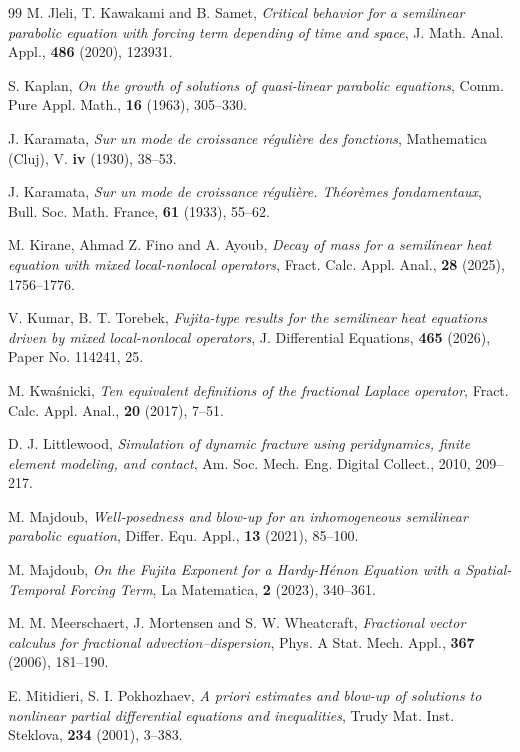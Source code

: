 \documentclass[12pt,reqno]{amsart}
\theoremstyle{plain}
\theoremstyle{definition}
\theoremstyle{remark}
\numberwithin{equation}{section}
\begin{document}
\begin{thebibliography}{99}
 {M. Jleli, T. Kawakami and B. Samet}, {\em Critical behavior for a semilinear parabolic equation with forcing term depending of time and space}, J. Math. Anal. Appl., {\bf 486} (2020), 123931.

 S. Kaplan, {\em On the growth of solutions of quasi-linear parabolic equations}, Comm. Pure Appl. Math., {\bf 16} (1963), 305--330.

 {J. Karamata}, {\em Sur un mode de croissance r\'eguli\`ere des fonctions}, Mathematica (Cluj), V. {\bf iv} (1930), 38--53.

 {J. Karamata}, {\em Sur un mode de croissance r\'eguli\`ere. {T}h\'eor\`emes fondamentaux}, {Bull. Soc. Math. France}, {\bf 61} (1933), {55--62}.


 {M. Kirane,  Ahmad Z. Fino and A. Ayoub}, {\em Decay of mass for a semilinear heat equation with mixed local-nonlocal operators}, {Fract. Calc. Appl. Anal.}, {\bf 28} (2025), {1756--1776}.

 V. Kumar, B. T. Torebek, {\em Fujita-type results for the semilinear heat equations driven by mixed local-nonlocal operators},  {J. Differential Equations}, {\bf 465} (2026), {Paper No. 114241, 25}.

 M. Kwaśnicki, {\em Ten equivalent definitions of the fractional Laplace operator}, Fract. Calc. Appl. Anal., {\bf 20} (2017), 7--51.


 D. J. Littlewood, {\em Simulation of dynamic fracture using peridynamics, finite element modeling, and contact}, Am. Soc. Mech. Eng. Digital Collect., 2010, 209--217. 

 M. Majdoub, {\em Well-posedness and blow-up for an inhomogeneous semilinear parabolic equation}, Differ. Equ. Appl., {\bf 13} (2021), {85--100}.

 M. Majdoub, {\em On the Fujita Exponent for a Hardy-H\'enon Equation with a Spatial-Temporal Forcing Term}, La Matematica, {\bf 2} (2023), 340--361.


 M. M. Meerschaert, J. Mortensen and S. W. Wheatcraft, {\em Fractional vector calculus for fractional advection–dispersion}, Phys. A Stat. Mech. Appl., {\bf 367} (2006), 181--190.

 E. Mitidieri, S. I. Pokhozhaev, {\em A priori estimates and blow-up of solutions to nonlinear partial differential equations and inequalities}, Trudy Mat. Inst. Steklova, {\bf 234} (2001), 3--383.


\end{thebibliography}
\end{document}
